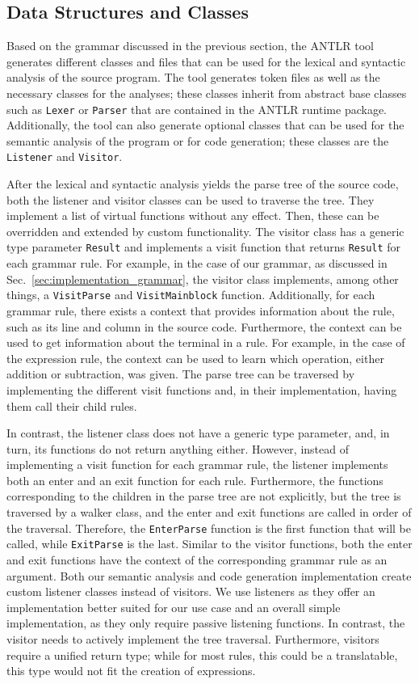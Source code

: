 \subsection{Data Structures and Classes}
\label{sec:implementation_syntax_dataStructuresClasses}
Based on the grammar discussed in the previous section, the ANTLR tool generates different classes and files that can be used for the lexical and syntactic analysis of the source program. The tool generates token files as well as the necessary classes for the analyses; these classes inherit from abstract base classes such as \texttt{Lexer} or \texttt{Parser} that are contained in the ANTLR runtime package. Additionally, the tool can also generate optional classes that can be used for the semantic analysis of the program or for code generation; these classes are the \texttt{Listener} and \texttt{Visitor}.

After the lexical and syntactic analysis yields the parse tree of the source code, both the listener and visitor classes can be used to traverse the tree. They implement a list of virtual functions without any effect. Then, these can be overridden and extended by custom functionality. The visitor class has a generic type parameter \texttt{Result} and implements a visit function that returns \texttt{Result} for each grammar rule. For example, in the case of our grammar, as discussed in Sec.~\ref{sec:implementation_grammar}, the visitor class implements, among other things, a \texttt{VisitParse} and \texttt{VisitMainblock} function.
Additionally, for each grammar rule, there exists a context that provides information about the rule, such as its line and column in the source code. Furthermore, the context can be used to get information about the terminal in a rule. For example, in the case of the expression rule, the context can be used to learn which operation, either addition or subtraction, was given. The parse tree can be traversed by implementing the different visit functions and, in their implementation, having them call their child rules.

In contrast, the listener class does not have a generic type parameter, and, in turn, its functions do not return anything either. However, instead of implementing a visit function for each grammar rule, the listener implements both an enter and an exit function for each rule. Furthermore, the functions corresponding to the children in the parse tree are not explicitly, but the tree is traversed by a walker class, and the enter and exit functions are called in order of the traversal. Therefore, the \texttt{EnterParse} function is the first function that will be called, while \texttt{ExitParse} is the last. Similar to the visitor functions, both the enter and exit functions have the context of the corresponding grammar rule as an argument. Both our semantic analysis and code generation implementation create custom listener classes instead of visitors. We use listeners as they offer an implementation better suited for our use case and an overall simple implementation, as they only require passive listening functions. In contrast, the visitor needs to actively implement the tree traversal. Furthermore, visitors require a unified return type; while for most rules, this could be a translatable, this type would not fit the creation of expressions.